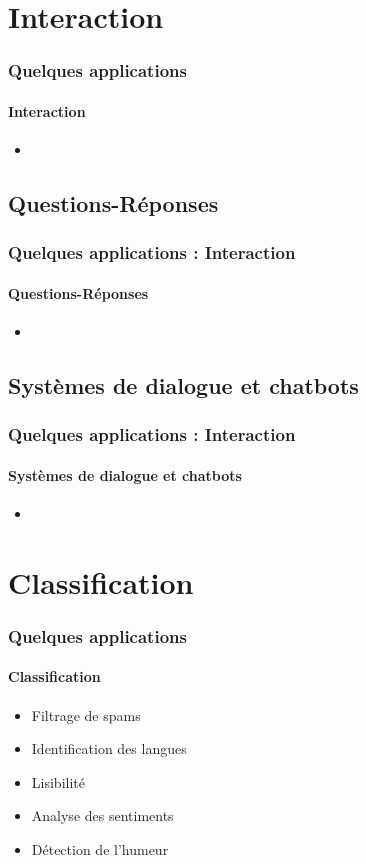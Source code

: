 \documentclass[xcolor=table]{beamer}
\begin{document}
\section{Interaction}

\begin{frame}
	\frametitle{Quelques applications}
	\framesubtitle{Interaction}
	\begin{itemize}
		\item 
	\end{itemize}
\end{frame}

\subsection{Questions-Réponses}

\begin{frame}
	\frametitle{Quelques applications : Interaction}
	\framesubtitle{Questions-Réponses}
	\begin{itemize}
		\item 
	\end{itemize}
\end{frame}

\subsection{Systèmes de dialogue et chatbots}

\begin{frame}
	\frametitle{Quelques applications : Interaction}
	\framesubtitle{Systèmes de dialogue et chatbots}
	\begin{itemize}
		\item 
	\end{itemize}
\end{frame}


\section{Classification}

\begin{frame}
	\frametitle{Quelques applications}
	\framesubtitle{Classification}
	\begin{itemize}
		\item Filtrage de spams
		\item Identification des langues
		\item Lisibilité 
		\item Analyse des sentiments
		\item Détection de l'humeur
	\end{itemize}
\end{frame}
\end{document}
